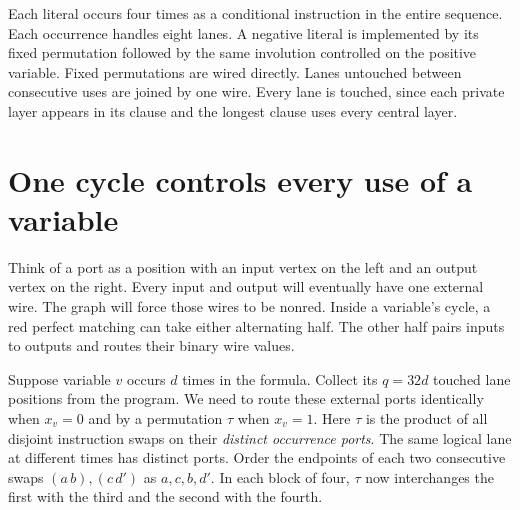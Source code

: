 \documentclass[12pt,letterpaper]{article}
\newcommand{\sh}[1]{\par\smallskip{\bfseries\color{ink}#1}\quad}
\newcommand{\Sec}[1]{\section{\color{ink}#1}}
\begin{document}
\begin{center}
\end{center}

\sh{Size.}
Each literal occurs four times as a conditional instruction in the entire sequence. Each occurrence handles eight lanes. A negative literal is implemented by its fixed permutation followed by the same involution controlled on the positive variable. Fixed permutations are wired directly. Lanes untouched between consecutive uses are joined by one wire. Every lane is touched, since each private layer appears in its clause and the longest clause uses every central layer.

\newpage
\Sec{One cycle controls every use of a variable}
Think of a port as a position with an input vertex on the left and an output vertex on the right. Every input and output will eventually have one external wire. The graph will force those wires to be nonred. Inside a variable's cycle, a red perfect matching can take either alternating half. The other half pairs inputs to outputs and routes their binary wire values.

\sh{External ports.}
Suppose variable \(v\) occurs \(d\) times in the formula. Collect its \(q=32d\) touched lane positions from the program. We need to route these external ports identically when \(x_v=0\) and by a permutation \(\tau\) when \(x_v=1\). Here \(\tau\) is the product of all disjoint instruction swaps on their \emph{distinct occurrence ports}. The same logical lane at different times has distinct ports. Order the endpoints of each two consecutive swaps \((a\,b),(c\,d')\) as \(a,c,b,d'\). In each block of four, \(\tau\) now interchanges the first with the third and the second with the fourth.
\end{document}
